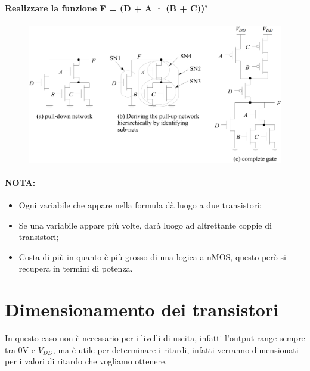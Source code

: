 \newpage

\paragraph{Realizzare	la	funzione		F	=	(D	+	A ·	(B	+	C))'}

\paragraph{}
\begin{figure}[htbp]
    \centering
    \includegraphics[width=0.8\linewidth]{img/rete.png}   
    
\end{figure}

\paragraph{NOTA:}

\begin{itemize}
    \item Ogni	variabile	che	appare	nella	formula	dà	luogo	a	due	transistori;
    \item Se	una	variabile	appare	più	volte,	darà	luogo	ad	altrettante	coppie	di	transistori;
    \item Costa di più in quanto è più grosso di una logica a nMOS, questo però si recupera in termini di potenza.
    
\end{itemize}

\newpage
\section{Dimensionamento dei transistori}

In questo caso non è necessario per	i livelli di	uscita, infatti l'output	range	sempre tra  0V	e	$V_{DD}$, ma è utile per determinare i ritardi, infatti verranno dimensionati per i valori di ritardo che vogliamo ottenere.

